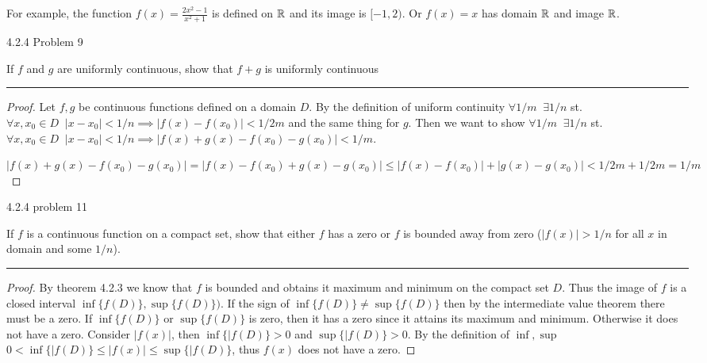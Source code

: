 \documentclass[11pt]{article}
\renewcommand{\sp}{\; \;}
\begin{document}
For example, the function $f(x) = \frac{2x^2 - 1}{x^2 +1}$ is defined on $\mathbb{R}$ and its image is $[-1, 2)$. Or $f(x) = x$ has domain $\mathbb{R}$ and image $\mathbb{R}$.


 4.2.4 Problem 9

If $f$ and $g$ are uniformly continuous, show that $f+g$ is uniformly continuous

\hrule

\begin{proof}

Let $f, g$ be continuous functions defined on a domain $D$. By the definition of uniform continuity $\forall 1/m \sp \exists 1/n$ st. $\forall x, x_0 \in D \sp |x - x_0| < 1/n \implies |f(x) - f(x_0)| < 1/2m$ and the same thing for $g$. 
Then we want to show $\forall 1/m \sp \exists 1/n$ st. $\forall x, x_0 \in D \sp |x - x_0| < 1/n \implies |f(x) + g(x) - f(x_0) - g(x_0)| < 1/m$. 

$|f(x) + g(x) - f(x_0) - g(x_0)| = |f(x) - f(x_0) + g(x) - g(x_0)| \leq |f(x) - f(x_0)| + |g(x) - g(x_0)| < 1/2m + 1/2m = 1/m$
\end{proof}





 4.2.4 problem 11

If $f$ is a continuous function on a compact set, show that either $f$ has a zero or $f$ is bounded away from zero ($|f(x)| > 1/n$ for all $x$ in domain and some $1/n$). 

\hrule



\begin{proof}

By theorem 4.2.3 we know that $f$ is bounded and obtains it maximum and minimum on the compact set $D$. 
Thus the image of $f$ is a closed interval $\inf\{f(D)\}, \sup\{f(D)\})$.
If the sign of $\inf\{f(D)\} \neq \sup\{f(D)\}$ then by the intermediate value theorem there must be a zero. 
If $\inf\{f(D)\}$ or $\sup\{f(D)\}$ is zero, then it has a zero since it attains its maximum and minimum. Otherwise it does not have a zero.
Consider $|f(x)|$, then $\inf\{|f(D)\} > 0$ and $\sup\{|f(D)\} > 0$.
By the definition of $\inf , \sup$ $0 < \inf\{|f(D)\} \leq |f(x)| \leq \sup\{|f(D)\}$, thus $f(x)$ does not have a zero. 

\end{proof}
\end{document}
